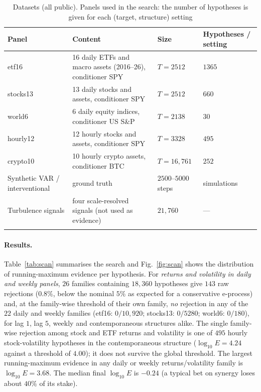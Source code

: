 \documentclass[pdflatex,sn-mathphys-ay]{sn-jnl}%
\theoremstyle{thmstyleone}%
\theoremstyle{thmstyletwo}%
\theoremstyle{thmstylethree}%
\begin{document}
\begin{table}[h]
\caption{Datasets (all public). Panels used in the search: the number of hypotheses is given for each (target, structure) setting}\label{tab:datasets}
\footnotesize
\begin{tabular*}{\textwidth}{@{\extracolsep\fill}p{2.4cm}p{3.8cm}p{2.2cm}p{2.6cm}}
\toprule
Panel & Content & Size & Hypotheses / setting \\
\midrule
etf16 & 16 daily ETFs and macro assets (2016--26), conditioner SPY & $T=2512$ & $1365$ \\
stocks13 & 13 daily stocks and assets, conditioner SPY & $T=2512$ & $660$ \\
world6 & 6 daily equity indices, conditioner US S\&P & $T=2138$ & $30$ \\
hourly12 & 12 hourly stocks and assets, conditioner SPY & $T=3328$ & $495$ \\
crypto10 & 10 hourly crypto assets, conditioner BTC & $T=16{,}761$ & $252$ \\
Synthetic VAR / interventional & ground truth & $2500$--$5000$ steps & simulations \\
Turbulence signals & four scale-resolved signals (not used as evidence) & $21{,}760$ & --- \\
\botrule
\end{tabular*}
\end{table}

\paragraph{Results.} Table~\ref{tab:scan} summarises the search and Fig.~\ref{fig:scan} shows the distribution of running-maximum evidence per hypothesis. For \emph{returns and volatility in daily and weekly panels},
$26$ families containing $18{,}360$ hypotheses give $143$ raw rejections ($0.8\%$, below the nominal $5\%$ as expected for a conservative e-process) and, at the family-wise threshold of their own family, \emph{no} rejection in any of the
$22$ daily and weekly families (etf16: $0/10{,}920$; stocks13: $0/5280$; world6: $0/180$), for lag $1$, lag $5$, weekly and contemporaneous structures alike. The single family-wise rejection among stock and ETF returns and volatility is one of $495$ hourly stock-volatility
hypotheses in the contemporaneous structure ($\log_{10}E=4.24$ against a threshold of $4.00$); it does not survive the global threshold. The largest running-maximum evidence in any daily or weekly returns/volatility family is $\log_{10}E=3.68$. The median final $\log_{10}E$ is $-0.24$ (a typical bet on synergy
loses about $40\%$ of its stake).
\end{document}
